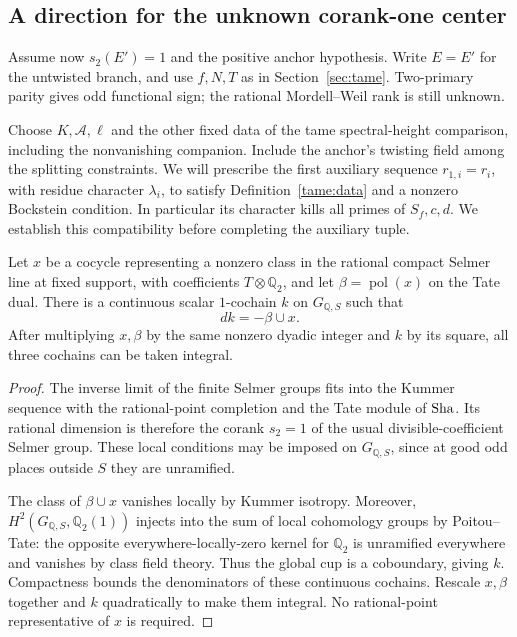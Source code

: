 \subsection{A direction for the unknown corank-one center}\label{subsec:positive-completion:direction}

Assume now \(s_2(E')=1\) and the positive anchor hypothesis. Write
\(E=E'\) for the untwisted branch, and use \(f,N,T\) as in
Section~\ref{sec:tame}. Two-primary parity gives odd functional sign;
the rational Mordell--Weil rank is still unknown.

Choose \(K,\mathcal A,\ell\) and the other fixed data of the tame
spectral-height comparison, including the nonvanishing companion.
Include the anchor's twisting field among the splitting constraints.
We will prescribe the first auxiliary sequence \(r_{1,i}=r_i\), with
residue character \(\lambda_i\), to satisfy Definition~\ref{tame:data}
and a nonzero Bockstein condition. In particular its character kills
all primes of \(S_f,c,d\). We establish this compatibility before
completing the auxiliary tuple.

\begin{lemma}\label{lem:positive-completion:self-cup}
Let \(x\) be a cocycle representing a nonzero class in the rational compact Selmer line at fixed
support, with coefficients \(T\otimes\mathbb Q_2\), and let
\(\beta=\operatorname{pol}(x)\) on the Tate dual. There is a continuous scalar
\(1\)-cochain \(k\) on \(G_{\mathbb Q,S}\) such that
\[
                              dk=-\beta\cup x.
\]
After multiplying \(x,\beta\) by the same nonzero dyadic integer and
\(k\) by its square, all three cochains can be taken integral.
\end{lemma}
\begin{proof}
The inverse limit of the finite Selmer groups fits into the Kummer
sequence with the rational-point completion and the Tate module of
\(\operatorname{Sha}\). Its rational dimension is therefore the corank \(s_2=1\)
of the usual divisible-coefficient Selmer group. These local
conditions may be imposed on \(G_{\mathbb Q,S}\), since at good odd
places outside \(S\) they are unramified.

The class of \(\beta\cup x\) vanishes locally by Kummer isotropy.
Moreover,
\(H^2(G_{\mathbb Q,S},\mathbb Q_2(1))\) injects into the sum of local
cohomology groups by Poitou--Tate: the opposite everywhere-locally-zero
kernel for \(\mathbb Q_2\) is unramified everywhere and vanishes by
class field theory. Thus the global cup is a coboundary, giving \(k\).
Compactness bounds the denominators of these continuous cochains.
Rescale \(x,\beta\) together and \(k\) quadratically to make them
integral. No rational-point representative of \(x\) is required.
\end{proof}

